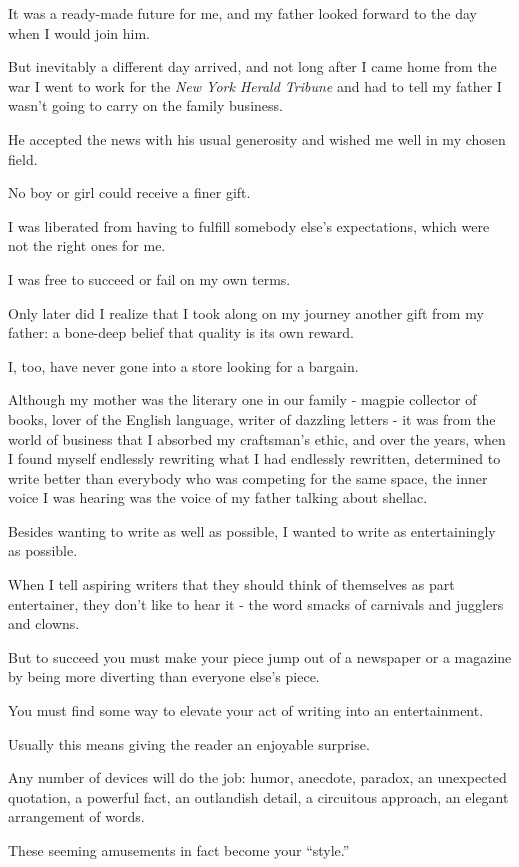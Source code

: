 \documentclass{book}
\numberwithin{equation}{section}
\begin{document}
It was a ready-made future for me, and my father looked forward to the day when I would join him.

But inevitably a different day arrived, and not long after I came home from the war I went to work for the \textit{New York Herald Tribune} and had to tell my father I wasn't going to carry on the family business.

He accepted the news with his usual generosity and wished me well in my chosen field.

No boy or girl could receive a finer gift.

I was liberated from having to fulfill somebody else's expectations, which were not the right ones for me.

I was free to succeed or fail on my own terms.

%
Only later did I realize that I took along on my journey another gift from my father: a bone-deep belief that quality is its own reward.

I, too, have never gone into a store looking for a bargain.

Although my mother was the literary one in our family - magpie collector of books, lover of the English language, writer of dazzling letters - it was from the world of business that I absorbed my craftsman's ethic, and over the years, when I found myself endlessly rewriting what I had endlessly rewritten, determined to write better than everybody who was competing for the same space, the inner voice I was hearing was the voice of my father talking about shellac.

%
Besides wanting to write as well as possible, I wanted to write as entertainingly as possible.

When I tell aspiring writers that they should think of themselves as part entertainer, they don't like to hear it - the word smacks of carnivals and jugglers and clowns.

But to succeed you must make your piece jump out of a newspaper or a magazine by being more diverting than everyone else's piece.

You must find some way to elevate your act of writing into an entertainment.

Usually this means giving the reader an enjoyable surprise.

Any number of devices will do the job: humor, anecdote, paradox, an unexpected quotation, a powerful fact, an outlandish detail, a circuitous approach, an elegant arrangement of words.

These seeming amusements in fact become your ``style.''
\end{document}
